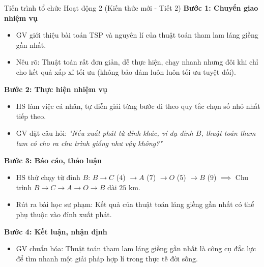 \documentclass[12pt, a4paper]{article}
\begin{document}
\begin{pedabox}{Tiến trình tổ chức Hoạt động 2 (Kiến thức mới - Tiết 2)}
    \textbf{Bước 1: Chuyển giao nhiệm vụ}
    \begin{itemize}[leftmargin=0.6cm]
        \item GV giới thiệu bài toán TSP và nguyên lí của thuật toán tham lam láng giềng gần nhất.
        \item Nêu rõ: Thuật toán rất đơn giản, dễ thực hiện, chạy nhanh nhưng đôi khi chỉ cho kết quả xấp xỉ tối ưu (không bảo đảm luôn luôn tối ưu tuyệt đối).
    \end{itemize}

    \textbf{Bước 2: Thực hiện nhiệm vụ}
    \begin{itemize}[leftmargin=0.6cm]
        \item HS làm việc cá nhân, tự diễn giải từng bước đi theo quy tắc chọn số nhỏ nhất tiếp theo.
        \item GV đặt câu hỏi: \textit{"Nếu xuất phát từ đỉnh khác, ví dụ đỉnh $B$, thuật toán tham lam có cho ra chu trình giống như vậy không?"}
    \end{itemize}

    \textbf{Bước 3: Báo cáo, thảo luận}
    \begin{itemize}[leftmargin=0.6cm]
        \item HS thử chạy từ đỉnh $B$: $B \to C$ ($4$) $\to A$ ($7$) $\to O$ ($5$) $\to B$ ($9$) $\implies$ Chu trình $B \to C \to A \to O \to B$ dài $25\text{ km}$.
        \item Rút ra bài học sư phạm: Kết quả của thuật toán láng giềng gần nhất có thể phụ thuộc vào đỉnh xuất phát.
    \end{itemize}

    \textbf{Bước 4: Kết luận, nhận định}
    \begin{itemize}[leftmargin=0.6cm]
        \item GV chuẩn hóa: Thuật toán tham lam láng giềng gần nhất là công cụ đắc lực để tìm nhanh một giải pháp hợp lí trong thực tế đời sống.
    \end{itemize}
\end{pedabox}
\end{document}
